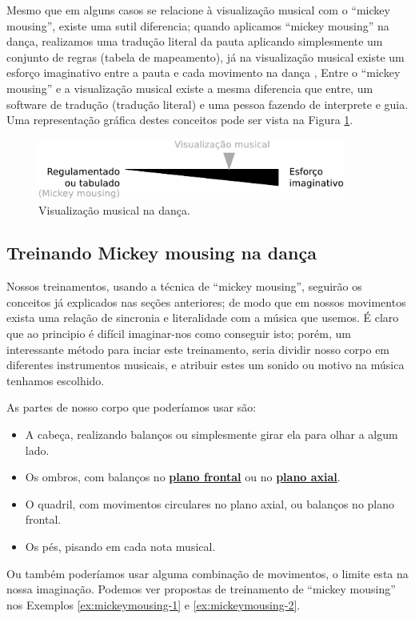 Mesmo que em alguns casos se relacione à visualização musical com o ``mickey mousing'',
existe uma sutil diferencia; quando aplicamos ``mickey mousing'' na dança, 
realizamos uma  tradução literal da pauta aplicando simplesmente um conjunto de regras (tabela de mapeamento),
já na visualização musical existe um esforço imaginativo entre a pauta e cada movimento na dança \cite[pp. 177]{acocella2004mark},
Entre o ``mickey mousing'' e a visualização musical existe a mesma diferencia que entre,
um software de tradução (tradução literal) e uma pessoa fazendo de interprete e guia.
Uma representação gráfica destes conceitos pode ser vista na Figura \ref{fig:musicvisualization}.

\begin{figure}[h!]
    \centering
    \includegraphics[width=0.9\textwidth]{chapters/cap-musicalidade-tecnica/musicvisualization.eps}
    \caption{Visualização musical na dança.}
    \label{fig:musicvisualization}
\end{figure}

\subsection{Treinando Mickey mousing na dança} 
Nossos treinamentos, usando a técnica de ``mickey mousing'',
seguirão os conceitos já explicados nas seções anteriores;
de modo que em nossos movimentos exista uma relação de sincronia e
literalidade com a música que usemos.
É claro que ao principio é difícil imaginar-nos como conseguir isto;
porém, um interessante método para inciar este treinamento, 
seria dividir nosso corpo em diferentes instrumentos musicais, 
e atribuir estes um sonido ou motivo na música tenhamos escolhido.

As partes de nosso corpo que poderíamos usar são:
\begin{itemize}
\item A cabeça, realizando balanços ou simplesmente girar ela para olhar a algum lado.
\item Os ombros, com balanços no \hyperref[def:PlanoFrontal]{\textbf{plano frontal}} ou 
no \hyperref[def:PlanoAxial]{\textbf{plano axial}}.
\item O quadril, com movimentos circulares no plano axial, ou balanços no plano frontal.
\item Os pés, pisando em cada nota musical.
\end{itemize}
Ou também poderíamos usar alguma combinação de movimentos,
o limite esta na nossa imaginação.
Podemos ver propostas de treinamento de ``mickey mousing'' nos Exemplos \ref{ex:mickeymousing-1} e \ref{ex:mickeymousing-2}.

